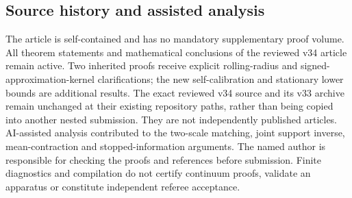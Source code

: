 \documentclass[11pt]{amsart}
\theoremstyle{definition}\newtheorem{definition}[theorem]{Definition}
\theoremstyle{remark}\newtheorem{remark}[theorem]{Remark}
\numberwithin{equation}{section}
\begin{document}
\subsection*{Source history and assisted analysis}
The article is self-contained and has no mandatory supplementary proof
volume. All theorem statements and mathematical conclusions of the
reviewed v34 article remain active. Two inherited proofs receive explicit
rolling-radius and signed-approximation-kernel clarifications; the new
self-calibration and stationary lower bounds are additional results.
The exact reviewed v34 source and its v33 archive remain unchanged at
their existing repository paths, rather than being copied into another
nested submission. They are not independently published articles.
AI-assisted analysis contributed to the two-scale matching, joint
support inverse, mean-contraction and stopped-information arguments.
The named author is responsible for checking the proofs and references
before submission. Finite diagnostics and compilation do not certify
continuum proofs, validate an apparatus or constitute independent
referee acceptance.

\end{document}
